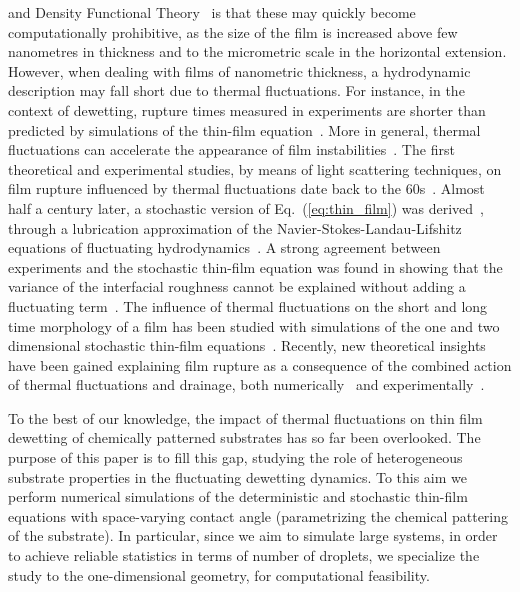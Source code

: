 and Density Functional Theory~\cite{PhysRevA.40.2567, tarazona1984simple, meister1985density, hughes2014introduction} is that these 
may quickly become computationally prohibitive, as the size of the film is increased above few nanometres in thickness and to the micrometric scale in the horizontal extension.
However, when dealing with films of nanometric thickness, a hydrodynamic description may fall short due to thermal fluctuations. 
For instance, in the context of dewetting, rupture times measured in experiments are shorter than predicted by simulations of the thin-film equation~\cite{herminghaus1996dewetting,herminghaus1998dewetting,beckerComplexDewettingScenarios2003}.
More in general, thermal fluctuations can accelerate the appearance of film instabilities~\cite{Rauscher2008,tsekov1993effect, fetzerThermalNoiseInfluences2007, zhangMolecularSimulationThin2019}.
The first theoretical and experimental studies, by means of light scattering techniques, on film rupture influenced by thermal fluctuations date back to the 60s~\cite{vrijRuptureThinLiquid1968}.
Almost half a century later, a stochastic version of Eq.~(\ref{eq:thin_film}) was derived~\cite{grunThinFilmFlowInfluenced2006, meckeThermalFluctuationsThin2005, davidovitchSpreadingViscousFluid2005}, through a lubrication approximation of the Navier-Stokes-Landau-Lifshitz 
equations of fluctuating hydrodynamics~\cite{landauFluidMechanicsLandau2013}.
A strong agreement between experiments and the stochastic thin-film equation was found in showing that the variance of the interfacial roughness cannot be explained without adding a fluctuating term~\cite{fetzerThermalNoiseInfluences2007}.
The influence of thermal fluctuations on the short and long time morphology of a film has been studied with simulations of the one and two dimensional stochastic thin-film equations~\cite{nesicFullyNonlinearDynamics2015, alizadeh_pahlavan_cueto-felgueroso_hosoi_mckinley_juanes_2018}. 
Recently, new theoretical insights have been gained explaining film rupture as a consequence of the combined action of thermal fluctuations and drainage, both numerically~\cite{shahThermalFluctuationsCapillary2019} and experimentally~\cite{PhysRevLett.125.158001}.

To the best of our knowledge, the impact of thermal fluctuations on thin film dewetting
of chemically patterned substrates has so far been overlooked.
The purpose of this paper is to fill this gap, studying the role of heterogeneous substrate properties in the fluctuating dewetting dynamics.
To this aim we perform numerical simulations of the deterministic and stochastic thin-film equations with space-varying contact angle 
(parametrizing the chemical pattering of the substrate). In particular, since we aim to simulate large systems, in order to achieve reliable 
statistics in terms of number of droplets, we specialize the study to the one-dimensional geometry, for computational feasibility.

